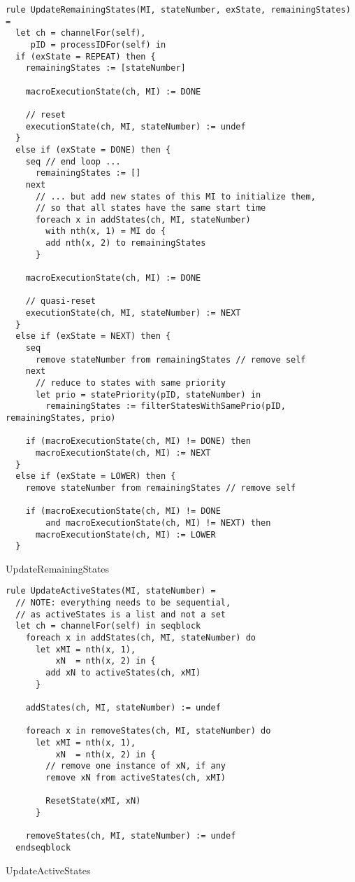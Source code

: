 \begin{listing}[H]
\begin{verbatim}
rule UpdateRemainingStates(MI, stateNumber, exState, remainingStates) =
  let ch = channelFor(self),
     pID = processIDFor(self) in
  if (exState = REPEAT) then {
    remainingStates := [stateNumber]

    macroExecutionState(ch, MI) := DONE

    // reset
    executionState(ch, MI, stateNumber) := undef
  }
  else if (exState = DONE) then {
    seq // end loop ...
      remainingStates := []
    next
      // ... but add new states of this MI to initialize them,
      // so that all states have the same start time
      foreach x in addStates(ch, MI, stateNumber)
        with nth(x, 1) = MI do {
        add nth(x, 2) to remainingStates
      }

    macroExecutionState(ch, MI) := DONE

    // quasi-reset
    executionState(ch, MI, stateNumber) := NEXT
  }
  else if (exState = NEXT) then {
    seq
      remove stateNumber from remainingStates // remove self
    next
      // reduce to states with same priority
      let prio = statePriority(pID, stateNumber) in
        remainingStates := filterStatesWithSamePrio(pID, remainingStates, prio)

    if (macroExecutionState(ch, MI) != DONE) then
      macroExecutionState(ch, MI) := NEXT
  }
  else if (exState = LOWER) then {
    remove stateNumber from remainingStates // remove self

    if (macroExecutionState(ch, MI) != DONE
        and macroExecutionState(ch, MI) != NEXT) then
      macroExecutionState(ch, MI) := LOWER
  }
\end{verbatim}
\caption{UpdateRemainingStates}
\label{lst:asm:UpdateRemainingStates}
\end{listing}




\begin{listing}[H]
\begin{verbatim}
rule UpdateActiveStates(MI, stateNumber) =
  // NOTE: everything needs to be sequential,
  // as activeStates is a list and not a set
  let ch = channelFor(self) in seqblock
    foreach x in addStates(ch, MI, stateNumber) do
      let xMI = nth(x, 1),
          xN  = nth(x, 2) in {
        add xN to activeStates(ch, xMI)
      }

    addStates(ch, MI, stateNumber) := undef

    foreach x in removeStates(ch, MI, stateNumber) do
      let xMI = nth(x, 1),
          xN  = nth(x, 2) in {
        // remove one instance of xN, if any
        remove xN from activeStates(ch, xMI)

        ResetState(xMI, xN)
      }

    removeStates(ch, MI, stateNumber) := undef
  endseqblock
\end{verbatim}
\caption{UpdateActiveStates}
\label{lst:asm:UpdateActiveStates}
\end{listing}




